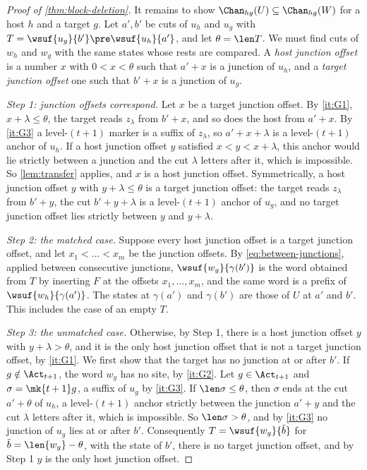 \begin{proof}[Proof of \cref{thm:block-deletion}]
It remains to show $\Chan_{hg}(U)\subseteq\Chan_{hg}(W)$ for a host $h$ and
a target $g$. Let $a',b'$ be cuts of $u_h$ and $u_g$ with
$T=\wsuf{u_g}{b'}\pre\wsuf{u_h}{a'}$, and let $\theta=\len T$. We must find
cuts of $w_h$ and $w_g$ with the same states whose rests are compared. A
\emph{host junction offset} is a number $x$ with $0<x<\theta$ such that
$a'+x$ is a junction of $u_h$, and a \emph{target junction offset} one such
that $b'+x$ is a junction of $u_g$.

\emph{Step 1: junction offsets correspond.} Let $x$ be a target junction
offset. By \ref{it:G1}, $x+\lambda\le\theta$, the target reads $z_\lambda$
from $b'+x$, and so does the host from $a'+x$. By \ref{it:G3} a
level-$(t+1)$ marker is a suffix of $z_\lambda$, so $a'+x+\lambda$ is a
level-$(t+1)$ anchor of $u_h$. If a host junction offset $y$ satisfied
$x<y<x+\lambda$, this anchor would lie strictly between a junction and the
cut $\lambda$ letters after it, which is impossible. So \cref{lem:transfer}
applies, and $x$ is a host junction offset. Symmetrically, a host junction
offset $y$ with $y+\lambda\le\theta$ is a target junction offset: the target
reads $z_\lambda$ from $b'+y$, the cut $b'+y+\lambda$ is a level-$(t+1)$
anchor of $u_g$, and no target junction offset lies strictly between $y$ and
$y+\lambda$.

\emph{Step 2: the matched case.} Suppose every host junction offset is a
target junction offset, and let $x_1<\dots<x_m$ be the junction offsets. By
\eqref{eq:between-junctions}, applied between consecutive junctions,
$\wsuf{w_g}{\gamma(b')}$ is the word obtained from $T$ by inserting $F$ at
the offsets $x_1,\dots,x_m$, and the same word is a prefix of
$\wsuf{w_h}{\gamma(a')}$. The states at $\gamma(a')$ and $\gamma(b')$ are
those of $U$ at $a'$ and $b'$. This includes the case of an empty $T$.

\emph{Step 3: the unmatched case.} Otherwise, by Step 1, there is a host
junction offset $y$ with $y+\lambda>\theta$, and it is the only host
junction offset that is not a target junction offset, by \ref{it:G1}. We
first show that the target has no junction at or after $b'$. If
$g\notin\Act_{t+1}$, the word $w_g$ has no site, by \ref{it:G2}. Let
$g\in\Act_{t+1}$ and $\sigma=\mk{t+1}g$, a suffix of $u_g$ by \ref{it:G3}.
If $\len\sigma\le\theta$, then $\sigma$ ends at the cut $a'+\theta$ of
$u_h$, a level-$(t+1)$ anchor strictly between the junction $a'+y$ and the
cut $\lambda$ letters after it, which is impossible. So $\len\sigma>\theta$,
and by \ref{it:G3} no junction of $u_g$ lies at or after $b'$. Consequently
$T=\wsuf{w_g}{\tilde b}$ for $\tilde b=\len{w_g}-\theta$, with the state of
$b'$, there is no target junction offset, and by Step 1 $y$ is the only host
junction offset.


\end{proof}
